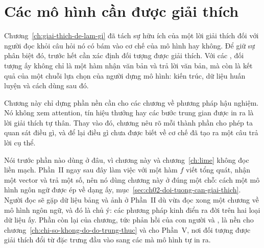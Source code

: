 \chapter{Các mô hình cần được giải thích}
\label{ch:mo-hinh-can-giai-thich}

Chương~\ref{ch:giai-thich-de-lam-gi} đã tách sự hữu ích của một lời giải
thích đối với người đọc khỏi câu hỏi nó có bám vào cơ chế của mô hình hay
không. Để giữ sự phân biệt đó, trước hết cần xác định đối tượng được giải
thích. Với các , đối tượng ấy không chỉ là một hàm nhận
văn bản và trả lời văn bản, mà còn là kết quả của một chuỗi lựa chọn của
người dựng mô hình: kiến trúc, dữ liệu huấn luyện và cách dùng sau đó.

Chương này chỉ dựng phần nền cần cho các chương về phương pháp hậu nghiệm. Nó
không xem attention, tín hiệu thưởng hay các bước trung gian được in ra là lời
giải thích tự thân.
Thay vào đó, chương nêu rõ mỗi thành phần cho phép ta quan sát điều gì, và để
lại điều gì chưa được biết về cơ chế đã tạo ra một câu trả lời cụ thể.

Nói trước phần nào dùng ở đâu, vì chương này và chương~\ref{ch:lime} không đọc
liền mạch. Phần~II ngay sau đây làm việc với một hàm $f$ viết tổng quát, nhận một
vector và trả một số, nên nó dùng chương này ở đúng một chỗ: cách một mô hình
ngôn ngữ được ép về dạng ấy, mục~\ref{sec:ch02-doi-tuong-can-giai-thich}. Người
đọc sẽ gặp dữ liệu bảng và ảnh ở Phần~II dù vừa đọc xong một chương về mô hình
ngôn ngữ, và đó là chủ ý: các phương pháp kinh điển ra đời trên hai loại dữ liệu
ấy. Phần còn lại của chương, tức phản hồi của con người và , là
nền cho chương~\ref{ch:chi-so-khong-do-do-trung-thuc} và cho Phần~V, nơi đối
tượng được giải thích đổi từ đặc trưng đầu vào sang các  mà mô hình
tự in ra.








